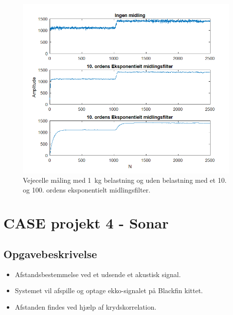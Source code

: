 \documentclass[danish]{article}
\begin{document}
\begin{figure}[H]
	\centering
	\includegraphics[width=0.6\linewidth]{graphics/case3_5}
	\caption{Vejecelle måling med \SI{1}{\kilogram} belastning og  uden belastning med et 10. og 100. ordens eksponentielt midlingsfilter.}
	\label{fig:case3_5}
\end{figure}


\newpage
\section{CASE projekt 4 - Sonar}
\subsection{Opgavebeskrivelse}
\begin{itemize}
	\item Afstandsbestemmelse ved et udsende et akustisk signal.
	\item Systemet vil afspille og optage ekko-signalet på Blackfin kittet.
	\item Afstanden findes ved hjælp af krydskorrelation. 
\end{itemize}
	
\end{document}
